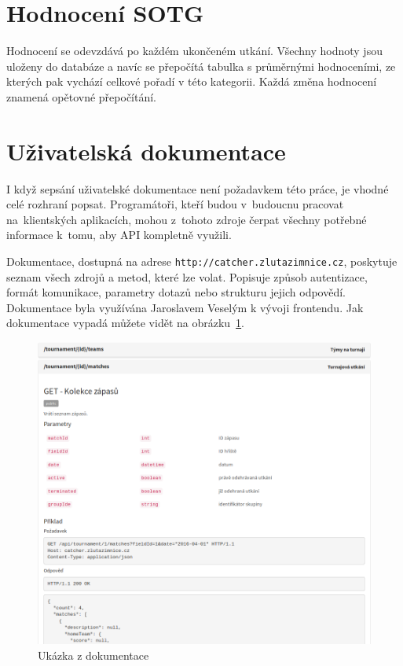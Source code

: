 \section{Hodnocení SOTG}

Hodnocení se odevzdává po každém ukončeném utkání. Všechny hodnoty jsou uloženy do databáze
a navíc se přepočítá tabulka s průměrnými hodnoceními, ze kterých pak vychází celkové pořadí v této kategorii.
Každá změna hodnocení znamená opětovné přepočítání.

\section{Uživatelská dokumentace}


I když sepsání uživatelské dokumentace není požadavkem této práce, je vhodné celé rozhraní popsat.
Programátoři, kteří budou v~budoucnu pracovat na~klient\-ských aplikacích, mohou z~tohoto zdroje čerpat všechny potřebné informace k~tomu, aby API kompletně využili.

Dokumentace, dostupná na adrese \texttt{http://catcher.zlutazimnice.cz},
poskytuje seznam všech zdrojů a metod, které lze volat. Popisuje způsob autentizace,
formát komunikace, parametry dotazů nebo strukturu jejich odpovědí.
Dokumentace byla využívána Jaroslavem Veselým k vývoji frontendu. Jak dokumentace vypadá můžete vidět na obrázku~\ref{fig:doc}.

\begin{figure}[ht!]
\centering
\includegraphics[width=130mm]{./images/doc.png}
\caption{Ukázka z dokumentace\label{overflow}}
\label{fig:doc}
\end{figure}